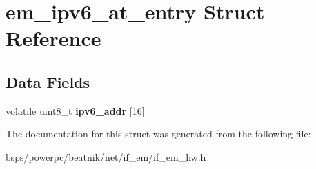 \hypertarget{structem__ipv6__at__entry}{}\section{em\+\_\+ipv6\+\_\+at\+\_\+entry Struct Reference}
\label{structem__ipv6__at__entry}
\subsection*{Data Fields}
\begin{DoxyCompactItemize}
\item 
\mbox{\label{structem__ipv6__at__entry_ab400058ed00489aa642838f60d30478f}} 
volatile uint8\+\_\+t {\bfseries ipv6\+\_\+addr} \mbox{[}16\mbox{]}
\end{DoxyCompactItemize}


The documentation for this struct was generated from the following file\+:\begin{DoxyCompactItemize}
\item 
bsps/powerpc/beatnik/net/if\+\_\+em/if\+\_\+em\+\_\+hw.\+h\end{DoxyCompactItemize}
